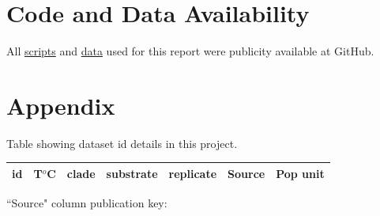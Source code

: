 \documentclass[a4paper, 11pt]{article}
\begin{document}
	\section*{Code and Data Availability}
	All \href{https://github.com/ph-u/CMEECourseWork_pmH/tree/master/MiniProject/code}{scripts} and \href{https://github.com/ph-u/CMEECourseWork_pmH/tree/master/MiniProject/data}{data} used for this report were publicity available at GitHub.
	\nocite{*}\printbibliography
	
	\section*{Appendix}
\begin{table}[H]
		\caption{Table showing dataset id details in this project.}\label{table:source}
\end{table}
\begin{small}
	\begin{longtable}{l|llllll}
		id&T$^{o}$C&clade&substrate&replicate&Source&Pop unit\\\hline
	\end{longtable}
\end{small}
``Source" column publication key:\\
\begin{longtable}{p{.05\linewidth}|p{.9\linewidth}}
\end{longtable}
\end{document}
